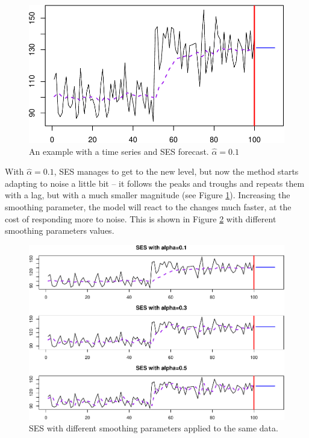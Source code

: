 \documentclass[]{book}
\theoremstyle{definition}
\theoremstyle{definition}
\theoremstyle{definition}
\theoremstyle{definition}
\theoremstyle{remark}
\begin{document}
\begin{figure}
\centering
\includegraphics{Svetunkov--2022----ADAM_files/figure-latex/SESExample2-1.pdf}
\caption{\label{fig:SESExample2}An example with a time series and SES forecast. \(\hat{\alpha}=0.1\)}
\end{figure}

With \(\hat{\alpha}=0.1\), SES manages to get to the new level, but now the method starts adapting to noise a little bit -- it follows the peaks and troughs and repeats them with a lag, but with a much smaller magnitude (see Figure \ref{fig:SESExample2}). Increasing the smoothing parameter, the model will react to the changes much faster, at the cost of responding more to noise. This is shown in Figure \ref{fig:SESExamples} with different smoothing parameters values.

\begin{figure}
\centering
\includegraphics{Svetunkov--2022----ADAM_files/figure-latex/SESExamples-1.pdf}
\caption{\label{fig:SESExamples}SES with different smoothing parameters applied to the same data.}
\end{figure}
\end{document}
